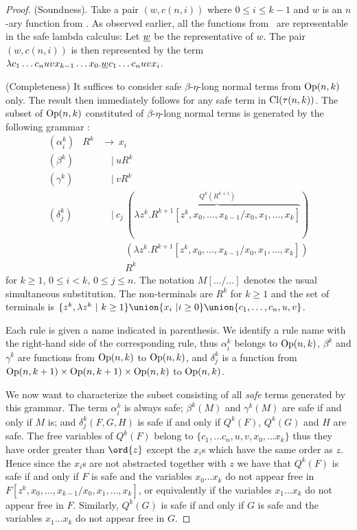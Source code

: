 \begin{proof}
  (Soundness). Take a pair $(w,c(n,i))$ where
  $0\leq i\leq k-1$ and $w$ is an $n$-ary function from \safedefset.
  As observed earlier, all the functions from \safedefset\ are representable
  in the safe lambda calculus: Let $\underline{w}$ be the representative of $w$.
  The pair $(w,c(n,i))$ is then represented by the term
  $ \lambda c_1 \ldots c_n u v x_{k-1} \ldots x_0 . \underline{w} c_1\ldots c_n u v x_i$.
\smallskip

(Completeness) It suffices to consider safe $\beta$-$\eta$-long
normal terms from ${\rm Op}(n,k)$ only. The result then
immediately follows for any safe term in ${\rm Cl}(\tau(n,k))$. The
subset of ${\rm Op}(n,k)$ constituted of $\beta$-$\eta$-long
normal terms is generated by the following grammar \cite{DBLP:journals/tcs/Zaionc87}:
\begin{eqnarray*}
  (\alpha_i^k) &R^k &\rightarrow\ x_i \\
  (\beta^k) && \quad|\  u R^k \\
  (\gamma^k) && \quad|\  v R^k \\
  (\delta^k_j) && \quad|\  c_j\ (\overbrace{\lambda z^k. R^{k+1}[z^k,x_0,\ldots, x_{k-1}/x_0,x_1, \ldots, x_k]}^{Q^k(R^{k+1})}) \\
  && \quad\  \quad \ (\lambda z^k. R^{k+1}[z^k,x_0,\ldots, x_{k-1}/x_0,x_1, \ldots, x_k]) \\
  && \quad\  \quad \ R^k
\end{eqnarray*}
for $k\geq 1$, $0\leq i< k$, $0\leq j\leq n$. The notation $M[\ldots/\ldots]$ denotes the usual simultaneous substitution. The non-terminals are
$R^k$ for $k\geq1$ and the set of terminals is $\{ z^k, \lambda z^k
\ |\ k\geq 1\} \union \{ x_i ~| i\geq 0 \} \union \{ c_1, \ldots,
c_n, u, v \}$.

Each rule is given a name indicated in parenthesis. We identify a rule name with the right-hand side of the corresponding rule, thus $\alpha_i^k$ belongs to ${\rm Op}(n,k)$,
$\beta^k$ and $\gamma^k$ are functions from ${\rm Op}(n,k)$ to
${\rm Op}(n,k)$, and $\delta^k_j$ is a function from
${\rm Op}(n,k+1) \times {\rm Op}(n,k+1) \times {\rm Op}(n,k)$
to ${\rm Op}(n,k)$.

We now want to characterize the subset consisting of all \emph{safe}
terms generated by this grammar. The term $\alpha_i^k$ is always
safe; $\beta^k(M)$ and $\gamma^k(M)$ are safe if and only if $M$ is;
and  $\delta^k_j(F,G,H)$ is safe if and only if $Q^k(F)$, $Q^k(G)$
and $H$ are safe. The free variables of $Q^k(F)$
belong to $\{ c_1, \ldots c_n, u, v, x_0,\ldots x_{k}\}$ thus they have order greater than $\ord{z}$ except the $x_i$s which have the same order as $z$. Hence since the $x_i$s are not abstracted together with $z$ we have that $Q^k(F)$ is safe if and only if $F$
is safe and the variables $x_0\ldots x_k$ do not appear free in
$F[z^k,x_0,\ldots, x_{k-1}/x_0,x_1, \ldots, x_k]$, or equivalently if the variables $x_1\ldots x_k$ do not appear free in $F$. Similarly, $Q^k(G)$ is safe if and only if $G$ is safe and
the variables $x_1\ldots x_k$ do not appear free in $G$.


\end{proof}

